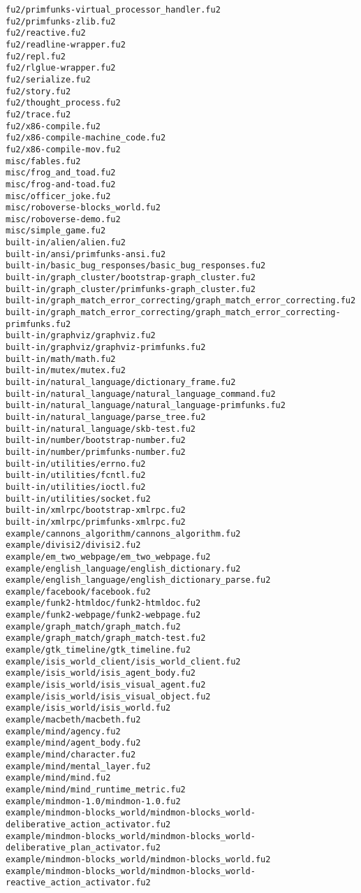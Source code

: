 \begin{lstlisting}
fu2/primfunks-virtual_processor_handler.fu2
fu2/primfunks-zlib.fu2
fu2/reactive.fu2
fu2/readline-wrapper.fu2
fu2/repl.fu2
fu2/rlglue-wrapper.fu2
fu2/serialize.fu2
fu2/story.fu2
fu2/thought_process.fu2
fu2/trace.fu2
fu2/x86-compile.fu2
fu2/x86-compile-machine_code.fu2
fu2/x86-compile-mov.fu2
misc/fables.fu2
misc/frog_and_toad.fu2
misc/frog-and-toad.fu2
misc/officer_joke.fu2
misc/roboverse-blocks_world.fu2
misc/roboverse-demo.fu2
misc/simple_game.fu2
built-in/alien/alien.fu2
built-in/ansi/primfunks-ansi.fu2
built-in/basic_bug_responses/basic_bug_responses.fu2
built-in/graph_cluster/bootstrap-graph_cluster.fu2
built-in/graph_cluster/primfunks-graph_cluster.fu2
built-in/graph_match_error_correcting/graph_match_error_correcting.fu2
built-in/graph_match_error_correcting/graph_match_error_correcting-primfunks.fu2
built-in/graphviz/graphviz.fu2
built-in/graphviz/graphviz-primfunks.fu2
built-in/math/math.fu2
built-in/mutex/mutex.fu2
built-in/natural_language/dictionary_frame.fu2
built-in/natural_language/natural_language_command.fu2
built-in/natural_language/natural_language-primfunks.fu2
built-in/natural_language/parse_tree.fu2
built-in/natural_language/skb-test.fu2
built-in/number/bootstrap-number.fu2
built-in/number/primfunks-number.fu2
built-in/utilities/errno.fu2
built-in/utilities/fcntl.fu2
built-in/utilities/ioctl.fu2
built-in/utilities/socket.fu2
built-in/xmlrpc/bootstrap-xmlrpc.fu2
built-in/xmlrpc/primfunks-xmlrpc.fu2
example/cannons_algorithm/cannons_algorithm.fu2
example/divisi2/divisi2.fu2
example/em_two_webpage/em_two_webpage.fu2
example/english_language/english_dictionary.fu2
example/english_language/english_dictionary_parse.fu2
example/facebook/facebook.fu2
example/funk2-htmldoc/funk2-htmldoc.fu2
example/funk2-webpage/funk2-webpage.fu2
example/graph_match/graph_match.fu2
example/graph_match/graph_match-test.fu2
example/gtk_timeline/gtk_timeline.fu2
example/isis_world_client/isis_world_client.fu2
example/isis_world/isis_agent_body.fu2
example/isis_world/isis_visual_agent.fu2
example/isis_world/isis_visual_object.fu2
example/isis_world/isis_world.fu2
example/macbeth/macbeth.fu2
example/mind/agency.fu2
example/mind/agent_body.fu2
example/mind/character.fu2
example/mind/mental_layer.fu2
example/mind/mind.fu2
example/mind/mind_runtime_metric.fu2
example/mindmon-1.0/mindmon-1.0.fu2
example/mindmon-blocks_world/mindmon-blocks_world-deliberative_action_activator.fu2
example/mindmon-blocks_world/mindmon-blocks_world-deliberative_plan_activator.fu2
example/mindmon-blocks_world/mindmon-blocks_world.fu2
example/mindmon-blocks_world/mindmon-blocks_world-reactive_action_activator.fu2

\end{lstlisting}
